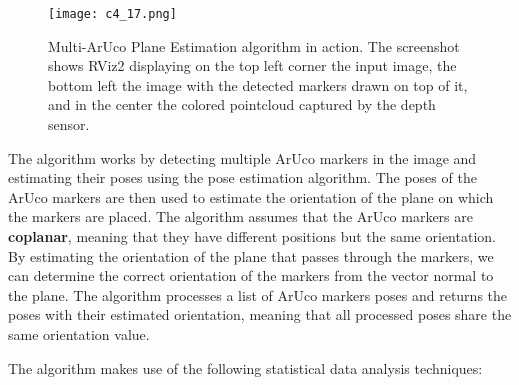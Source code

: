 \begin{figure}[t]
    \centering
    \texttt{[image: c4\_17.png]}
    \caption{Multi-ArUco Plane Estimation algorithm in action. The screenshot shows RViz2 displaying
    on the top left corner the input image, the bottom left the image with the detected markers drawn on top of it,
    and in the center the colored pointcloud captured by the depth sensor.}
    \label{fig:multi_aruco}
\end{figure}

The algorithm works by detecting multiple ArUco markers in the image and estimating their poses using the pose
estimation algorithm. The poses of the ArUco markers are then used to estimate the orientation of the plane
on which the markers are placed. The algorithm assumes that the ArUco markers are \textbf{coplanar}, meaning that 
they have different positions but the same orientation. By estimating the orientation of the plane that passes
through the markers, we can determine the correct orientation of the markers from the vector normal
to the plane. The algorithm processes a list of ArUco markers poses and returns the poses with their
estimated orientation, meaning that all processed poses share the same orientation value.

The algorithm makes use of the following statistical data analysis techniques:

